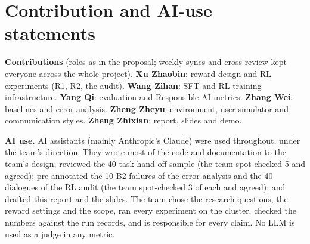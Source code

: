 \documentclass[12pt,a4paper]{article}
\begin{document}
\section{Contribution and AI-use statements}
\label{sec:ai}

\textbf{Contributions} (roles as in the proposal; weekly syncs and
cross-review kept everyone across the whole project).
\textbf{Xu Zhaobin}: reward design and RL experiments (R1, R2, the audit).
\textbf{Wang Zihan}: SFT and RL training infrastructure.
\textbf{Yang Qi}: evaluation and Responsible-AI metrics.
\textbf{Zhang Wei}: baselines and error analysis.
\textbf{Zheng Zheyu}: environment, user simulator and communication styles.
\textbf{Zheng Zhixian}: report, slides and demo.

\textbf{AI use.} AI assistants (mainly Anthropic's Claude) were used
throughout, under the team's direction. They wrote most of the code and
documentation to the team's design; reviewed the 40-task hand-off sample
(the team spot-checked 5 and agreed); pre-annotated the 10 B2 failures of the
error analysis and the 40 dialogues of the RL audit (the team spot-checked 3
of each and agreed); and drafted this report and the slides. The team chose
the research questions, the reward settings and the scope, ran every
experiment on the cluster, checked the numbers against the run records, and
is responsible for every claim. No LLM is used as a judge in any metric.
\end{document}
